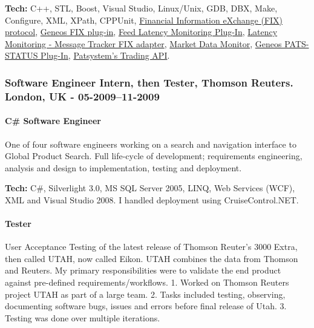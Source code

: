 \documentclass[
  a4paper,
]{article}
\begin{document}
\textbf{Tech:} C++, STL, Boost, Visual Studio, Linux/Unix, GDB, DBX,
Make, Configure, XML, XPath, CPPUnit,
\href{https://en.wikipedia.org/wiki/Financial_Information_eXchange}{Financial
Information eXchange (FIX) protocol},
\href{https://docs.itrsgroup.com/docs/geneos/5.1.0/Netprobe/trading_fix/fix.html}{Geneos
FIX plug-in},
\href{https://docs.itrsgroup.com/docs/geneos/5.2.0/Netprobe/market_data_monitoring/feedadapter_ug.html}{Feed
Latency Monitoring Plug-In},
\href{https://docs.itrsgroup.com/docs/geneos/5.2.0/Netprobe/latency_monitoring/message_tracker/fix_adapter.html}{Latency
Monitoring - Message Tracker FIX adapter},
\href{https://docs.itrsgroup.com/docs/geneos/5.2.0/Netprobe/market_data_monitoring/mdm_ug.html}{Market
Data Monitor},
\href{https://docs.itrsgroup.com/docs/geneos/5.1.0/Netprobe/trading_pats/pats-status.html}{Geneos
PATS-STATUS Plug-In}, \href{www.patsystems.com}{Patsystem's Trading
API}.

\hypertarget{software-engineer-intern-then-tester-thomson-reuters.-london-uk---05-200911-2009}{%
\subsubsection{Software Engineer Intern, then Tester, Thomson Reuters.
London, UK -
05-2009--11-2009}\label{software-engineer-intern-then-tester-thomson-reuters.-london-uk---05-200911-2009}}

\hypertarget{c-software-engineer}{%
\paragraph{C\# Software Engineer}\label{c-software-engineer}}

One of four software engineers working on a search and navigation
interface to Global Product Search. Full life-cycle of development;
requirements engineering, analysis and design to implementation, testing
and deployment.

\textbf{Tech:} C\#, Silverlight 3.0, MS SQL Server 2005, LINQ, Web
Services (WCF), XML and Visual Studio 2008. I handled deployment using
CruiseControl.NET.

\hypertarget{tester}{%
\paragraph{Tester}\label{tester}}

User Acceptance Testing of the latest release of Thomson Reuter's 3000
Extra, then called UTAH, now called Eikon. UTAH combines the data from
Thomson and Reuters. My primary responsibilities were to validate the
end product against pre-defined requirements/workflows. 1. Worked on
Thomson Reuters project UTAH as part of a large team. 2. Tasks included
testing, observing, documenting software bugs, issues and errors before
final release of Utah. 3. Testing was done over multiple iterations.
\end{document}
